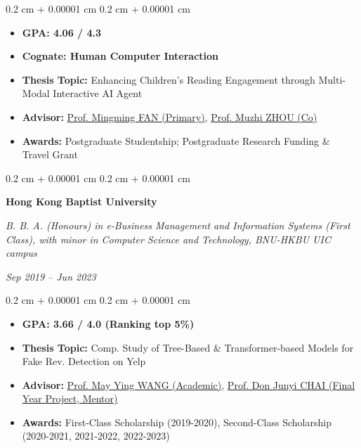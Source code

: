 \documentclass[10pt, letterpaper]{article}
\newenvironment{highlights}{
    \begin{itemize}[
        topsep=0.10 cm,
        parsep=0.10 cm,
        partopsep=0pt,
        itemsep=0pt,
        leftmargin=0.4 cm + 10pt
    ]
}{
    \end{itemize}
} %
\newenvironment{onecolentry}{
    \begin{adjustwidth}{
        0.2 cm + 0.00001 cm
    }{
        0.2 cm + 0.00001 cm
    }
}{
    \end{adjustwidth}
} %
\newenvironment{twocolentry}[2][]{
    \onecolentry
    \def\secondColumn{#2}
    \setcolumnwidth{\fill, 4.5 cm}
    \begin{paracol}{2}
}{
    \switchcolumn \raggedleft \secondColumn
    \end{paracol}
    \endonecolentry
} %
\let\hrefWithoutArrow\href
\renewcommand{\href}[2]{\hrefWithoutArrow{#1}{\ifthenelse{\equal{#2}{}}{ }{#2 }\raisebox{.15ex}{\footnotesize \faExternalLink*}}}
\renewcommand{\href}[2]{\hrefWithoutArrow{#1}{#2}}
\begin{document}
        \vspace{0.10 cm}
        \begin{onecolentry}
            \begin{highlights}
                \item \textbf{GPA: 4.06 / 4.3}
                \item \textbf{Cognate: Human Computer Interaction}
                \item \textbf{Thesis Topic:} Enhancing Children's Reading Engagement through Multi-Modal Interactive AI Agent
                \item \textbf{Advisor:} \href{https://www.mingmingfan.com/}{Prof. Mingming FAN (Primary)}, \href{https://sosc.hkust.edu.hk/people/muzhi-zhou/}{Prof. Muzhi ZHOU (Co)} 
                \item \textbf{Awards:} Postgraduate Studentship; Postgraduate Research Funding \& Travel Grant
            \end{highlights}
        \end{onecolentry}

        \vspace{0.2 cm}

        \begin{twocolentry}{
        \textit{Sep 2019 – Jun 2023}}
            \textbf{Hong Kong Baptist University}

            \textit{B. B. A. (Honours) in e-Business Management and Information Systems (First Class), with minor in Computer Science and Technology, BNU-HKBU UIC campus}
        \end{twocolentry}

        \vspace{0.10 cm}
        \begin{onecolentry}
            \begin{highlights}
                \item \textbf{GPA: 3.66 / 4.0 (Ranking top 5\%)}
                \item \textbf{Thesis Topic:} Comp. Study of Tree-Based \& Transformer-based Models for Fake Rev. Detection on Yelp
                \item \textbf{Advisor:} \href{https://staff.uic.edu.cn/ywang/en}{Prof. May Ying WANG (Academic)}, \href{https://sites.google.com/view/chaijunyi/home}{Prof. Don Junyi CHAI (Final Year Project, Mentor)}
                \item \textbf{Awards:} First-Class Scholarship (2019-2020), Second-Class Scholarship (2020-2021, 2021-2022, 2022-2023)
            \end{highlights}
        \end{onecolentry}
\end{document}
